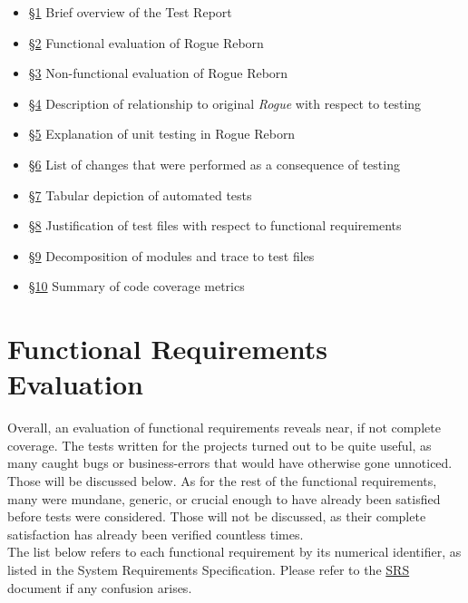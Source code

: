 \documentclass[12pt, titlepage]{article}
\newcommand{\newsection}[1]{
  \newpage
  \section{#1}
}
\begin{document}
	\begin{itemize}
		\item [] \hyperref[Section_Intro]{\S 1} Brief overview of the Test Report
		\item [] \hyperref[Section_FR_Evaluation]{\S 2} Functional evaluation of Rogue Reborn
		\item [] \hyperref[Section_NFR_Evaluation]{\S 3} Non-functional evaluation of Rogue Reborn
		\item [] \hyperref[Section_Comparison]{\S 4} Description of relationship to original \textit{Rogue} with respect to testing 
		\item [] \hyperref[Section_UT]{\S 5} Explanation of unit testing in Rogue Reborn
		\item [] \hyperref[Section_Changes]{\S 6} List of changes that were performed as a consequence of testing
		\item [] \hyperref[Section_Automated]{\S 7} Tabular depiction of automated tests
		\item [] \hyperref[Section_R_Trace]{\S 8} Justification of test files with respect to functional requirements
		\item [] \hyperref[Section_M_Trace]{\S 9} Decomposition of modules and trace to test files
		\item [] \hyperref[Section_Metrics]{\S 10} Summary of code coverage metrics

	\end{itemize}

\newsection{Functional Requirements Evaluation} \label{Section_FR_Evaluation}
	Overall, an evaluation of functional requirements reveals near, if not complete coverage. The tests written for the projects turned out to be quite useful, as many caught bugs or business-errors that would have otherwise gone unnoticed. Those will be discussed below. As for the rest of the functional requirements, many were mundane, generic, or crucial enough to have already been satisfied before tests were considered. Those will not be discussed, as their complete satisfaction has already been verified countless times.\\

	The list below refers to each functional requirement by its numerical identifier, as listed in the System Requirements Specification. Please refer to the \href{run:../SRS/SRS.pdf}{SRS} document if any confusion arises.
\end{document}
